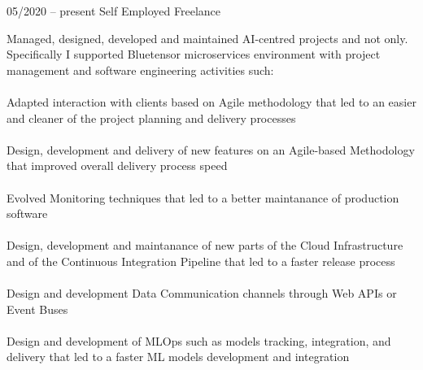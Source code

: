 \documentclass[9pt, green]{template/developercv} %
\begin{document}
{\begin{entrylist}
	\entry
	{05/2020 -- present }
	{}
	{Self Employed \space\cpipe\space Freelance}
	{
		\vspace{0.3mm}
		\begin{minipage}[t]{0.75\textwidth}				
			\vspace{-\baselineskip}
            Managed, designed, developed and maintained AI-centred projects and not only. Specifically I supported Bluetensor microservices environment with project management and software engineering activities such:\\
            \vspace{-3mm}\\
            \itemmarker Adapted interaction with clients based on Agile methodology  that led to an easier and cleaner of the project planning and delivery processes\\
            \vspace{-3mm}\\
            \itemmarker Design, development and delivery of new features on an Agile-based Methodology that improved overall delivery process speed\\
            \vspace{-3mm}\\
            \itemmarker Evolved Monitoring techniques that led to a better maintanance of production software\\
            \vspace{-3mm}\\
            \itemmarker Design, development and maintanance of new parts of the Cloud Infrastructure and of the Continuous Integration Pipeline that led to a faster release process\\
            \vspace{-3mm}\\
            \itemmarker Design and development Data Communication channels through Web APIs or Event Buses\\
            \vspace{-3mm}\\
            \itemmarker Design and development of MLOps such as models tracking, integration, and delivery that led to a faster ML models development and integration\\
            \vspace{-3mm}\\
            
		\end{minipage}

}
\end{entrylist}}
\end{document}
